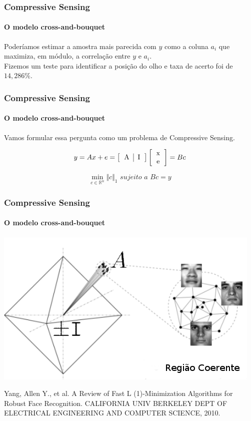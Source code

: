 \documentclass[11pt]{beamer}
\begin{document}
\begin{frame}
\frametitle{Compressive Sensing}
\framesubtitle{O modelo cross-and-bouquet}

Poderíamos estimar a amostra mais parecida com $y$ como a coluna $a_i$ que maximiza, em módulo, a correlação entre $y$ e $a_i$.\\


Fizemos um teste para identificar a posição do olho e taxa de acerto foi de $14,286\%$.
\end{frame}

\begin{frame}
\frametitle{Compressive Sensing}
\framesubtitle{O modelo cross-and-bouquet}

Vamos formular essa pergunta como um problema de Compressive Sensing.

$$y = Ax + e = \left[ \begin{tabular}{c | c} A & I \end{tabular} \right] \left[ \begin{tabular}{c} x \\ e \end{tabular}\right] = Bc$$

$$\min_{c \in \mathbb{R}^n} \Vert c \Vert_1 \textit{ sujeito a } Bc = y$$
\end{frame}

\begin{frame}
\frametitle{Compressive Sensing}
\framesubtitle{O modelo cross-and-bouquet}
\centering
\includegraphics[scale=.4]{imagens/cross-and-bouquet.png}

\tiny{Yang, Allen Y., et al. A Review of Fast L (1)-Minimization Algorithms for Robust Face Recognition. CALIFORNIA UNIV BERKELEY DEPT OF ELECTRICAL ENGINEERING AND COMPUTER SCIENCE, 2010.}
\end{frame}
\end{document}
